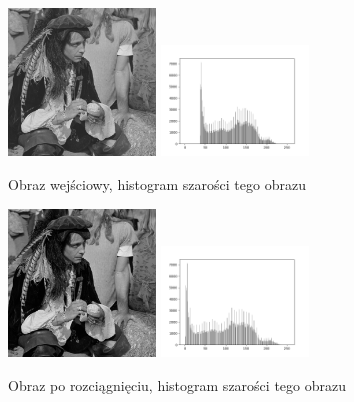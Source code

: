 \documentclass[final,a4paper,openany,12pt]{mwbk}
\begin{document}
\begin{figure}[H]
	\begin{center}
		\includegraphics[width=0.35\textwidth]{pirate_gray}
		\includegraphics[width=0.35\textwidth]{pirate_gray_histogram}
	\end{center}
	\caption{Obraz wejściowy, histogram szarości tego obrazu}
\end{figure}

\begin{figure}[H]
	\begin{center}
		\includegraphics[width=0.35\textwidth]{pirate_gray_stretchHist_result}
		\includegraphics[width=0.35\textwidth]{pirate_gray_stretchHist_histogram}
	\end{center}
	\caption{Obraz po rozciągnięciu, histogram szarości tego obrazu}
\end{figure}
\end{document}
